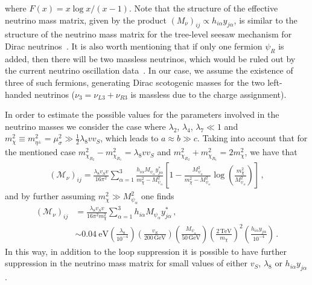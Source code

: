\documentclass[12pt]{article}
\begin{document}
%
where $F(x) =x \log x/(x-1)$. 
Note that the structure of the effective neutrino mass matrix, given by the
product $(M_{\nu})_{ij} \propto h_{i \alpha} y_{j\alpha}$, is similar to
the structure of the neutrino mass matrix for the tree-level seesaw
mechanism for Dirac neutrinos~\cite{Chulia:2016ngi}. 
It is also worth mentioning that if only one
fermion $\psi_R$ is added, then there will be two massless neutrinos, which
would be ruled out by the current neutrino oscillation data~\cite{deSalas:2017kay}. 
In our case, we assume the
existence of three of such fermions, generating Dirac scotogenic masses for
the two left-handed neutrinos ($\nu_{3}=\nu_{L3}+\nu_{R3}$ is massless due to the charge assignment). 

In order to estimate the possible values for the parameters involved in the neutrino masses we consider the case where $\lambda_2$, $\lambda_4$, $\lambda_7 \ll 1$ and $m_\chi^2\equiv m_{\eta^{\pm}}^2 = \mu^2_{\sigma} \gg \frac{1}{2} \lambda_8 v v_S$, which leads to $a\approx b\gg c$. 
Taking into account that for the mentioned case $m^2_{\chi_{R_{2}}}-m^2_{\chi_{R_{1}}} = \lambda_8 v v_{S}$ and $m^2_{\chi_{R_{2}}}+m^2_{\chi_{R_{1}}} = 2 m^2_\chi$, we have that
%
\begin{align}
(\mathcal{M}_{\nu})_{ij} = \frac{\lambda_8 v_S v}{16 \pi^{2}} \sum_{\alpha=1}^{3} \frac{h_{i \alpha} M_{\psi_{\alpha}} y^{*}_{j\alpha}} {m_\chi^{2}-M_{\psi_{\alpha}}^{2}} \left[1 - \frac{M_{\psi_{\alpha}}^{2}}{m_\chi^{2}-M_{\psi_{\alpha}}^{2}} \log \left( \frac{m_{\chi}^{2}}{M_{\psi_{\alpha}}^{2}} \right)\right]\,,
\end{align}
%
and by further assuming $m_{\chi}^{2} \gg M_{\psi_{\alpha}}^2$ one finds 
%
\begin{align}
(\mathcal{M}_{\nu})_{ij} & = \frac{\lambda_8 v_S v}{16 \pi^{2}m_{\chi}^{2}} \sum_{\alpha=1}^{3} h_{i \alpha} M_{\psi_\alpha}y^{*}_{j\alpha}\,, \\
& \sim 0.04~\text{eV} \left( \frac{\lambda_8}{10^{-4}}\right) \left( \frac{v_{S}}{200\,  \text{GeV}}\right) \left( \frac{M_{\psi_\alpha}}{50\,\text{GeV}}\right) \left( \frac{2\, \text{TeV}}{m_{\chi}}\right)^{2} \left( \frac{h_{i \alpha} y_{j\alpha}}{10^{-4}}\right)\,. 
\end{align}
%
In this way, in addition to the loop suppression it is possible to 
have further suppression in the neutrino mass matrix for small values
of either $v_S$, $\lambda_8$ or $h_{i \alpha} y_{j\alpha}$.
\end{document}
